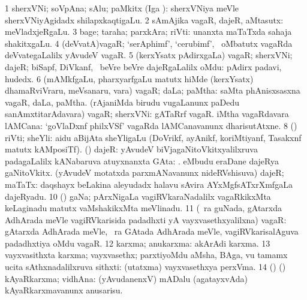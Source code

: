 \bentry
{}
\gl{\nA}
\bmng
\bnum
\num{1} sherxVNi; soVpAna; sAlu; paMkitx (Iga \viparx):  sherxVNiya meVle sherxVNiyAgidadx shilapxkaqtigaLu. 
\num{2} sAmAjika vagaR, dajeR, aMtasutx:  meVladxjeRgaLu. 
\num{3} bage; taraha; parxkAra; riVti:  unanxta maTaTxda sahaja shakitxgaLu. 
\num{4} (deVvatA)vagaR; `serAphimf', `cerubimf', \mo\ oMbatutx vagaRda deVvategaLalilx yAvudeV vagaR. 
\num{5} (kerxYsatx pAdirxgaLa) vagaR; sherxVNi; dajeR; biSapf, DiVkanf, \mo\ beVre beVre dajeRgaLalilx oMdu:  pAdirx padavi, hudedx. 
\num{6} (mAMkfgaLu, pharxyarfgaLu matutx hiMde (kerxYsatx) dhamaRviVraru, meVsanaru, \mo vara) vagaR; daLa; paMtha:  saMta phAnisxsasxna vagaR, daLa, paMtha. 
 (rAjaniMda birudu \mo vugaLanunx paDedu sanAmxtitarAdavara) 
\banum
{} vagaR; sherxVNi:  gATaRrf vagaR. 
 iMtha vagaRdavara lAMCana:  `goVlaDxnf philxVSf' vagaRda lAMCanavanunx dharisutAtxne. 
\eanum
\numie
\num{8} (\vAshi) riVti; sheYli:  aidu aBijAta sheYligaLu (DoVrikf, ayAnikf, koriMtiyanf, Tasakxnf matutx kAMposiTf).  
 (\ga) dajeR: 
\banum
{} yAvudeV biVjagaNitoVkitxyalilxruva padagaLalilx kANabaruva atuyxnanxta GAta:  .  eMbudu eraDane dajeRya gaNitoVkitx. 
 (yAvudeV motatxda parxmANavanunx nideRVshisuva) dajeR; maTaTx:  daqshayx beLakina aleyudadx halavu sAvira AYxMgfsATxrXmfgaLa dajeRyadu. 
\eanum
\numie
\num{10} (\jiVvi) gaNa; pArxNigaLa vagiRVkaraNadalilx vagaRkikxMta keLaginadu matutx vaMshakikxMta meVlinadu. 
\num{11} (\sA\ ra guNada, gAtarxda AdhArada meVle vagiRVkarisida padadhxti yA vayxvasethxyalilxna) vagaR:  gAtarxda AdhArada meVle, \sA\ ra GAtada AdhArada meVle, vagiRVkarisalAguva padadhxtiya oMdu vagaR. 
\num{12} karxma; anukarxma:  akArAdi karxma. 
\num{13} vayxvasithxta karxma; vayxvasethx; parxtiyoMdu aMsha, BAga, \mo vu tamamx ucita sAthxnadalilxruva sithxti:  (utatxma) vayxvasethxya perxVma. 
\num{14} (\birx) (\pArxparx) kAyaRkarxma; vidhAna:  (yAvudanenxV) mADalu (agatayxvAda) kAyaRkarxmavanunx anusarisu. 
